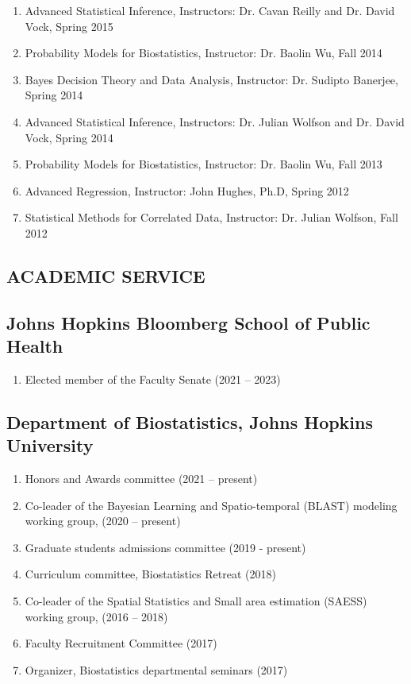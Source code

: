 \documentclass[12pt]{article}
\newcommand{\mydot}[1]{\begin{enumerate}[label=$\circ$,leftmargin=\parindent]\setlength{\itemsep}{#1}}
\newcommand{\ee}{\end{enumerate}}
\begin{document}
\mydot{-0.1em}

\item Advanced Statistical Inference, Instructors: Dr. Cavan Reilly and Dr. David Vock, Spring 2015

\item Probability Models for Biostatistics, Instructor: Dr. Baolin Wu, Fall 2014

\item Bayes Decision Theory and Data Analysis, Instructor: Dr. Sudipto Banerjee, Spring 2014

\item Advanced Statistical Inference, Instructors: Dr. Julian Wolfson and Dr. David Vock, Spring 2014

\item Probability Models for Biostatistics, Instructor: Dr. Baolin Wu, Fall 2013

\item Advanced Regression, Instructor: John Hughes, Ph.D, Spring 2012

\item Statistical Methods for Correlated Data, Instructor: Dr. Julian Wolfson, Fall 2012

\ee

\newpage



\newpage
\subsection*{ACADEMIC SERVICE}

\smallskip

\subsection*{Johns Hopkins Bloomberg School of Public Health}
\mydot{-0.1em}
\item Elected member of the Faculty Senate (2021 -- 2023)
\ee

\subsection*{Department of Biostatistics, Johns Hopkins University}

\mydot{-0.1em}
\item Honors and Awards committee (2021 -- present)
\item Co-leader of the Bayesian Learning and Spatio-temporal (BLAST) modeling working group, (2020 -- present)
\item Graduate students admissions committee (2019 - present)
\item Curriculum committee, Biostatistics Retreat (2018)
\item Co-leader of the Spatial Statistics and Small area estimation (SAESS)  working group, (2016 -- 2018)
\item Faculty Recruitment Committee (2017)
\item Organizer, Biostatistics departmental seminars (2017)
\ee
\end{document}
